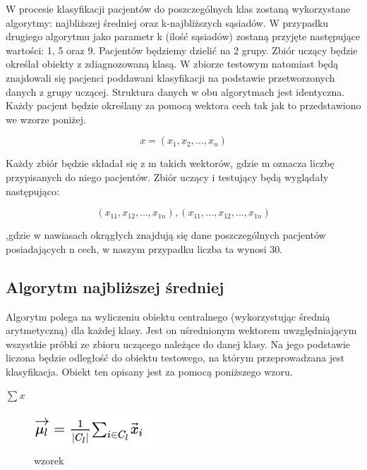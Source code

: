 \documentclass[12pt]{article}
\begin{document}
\indent W procesie klasyfikacji pacjentów do poszczególnych klas zostaną wykorzystane algorytmy: najbliższej średniej oraz k-najbliższych sąsiadów. W przypadku drugiego algorytmu jako parametr k (ilość sąsiadów) zostaną przyjęte następujące wartości: 1, 5 oraz 9. Pacjentów będziemy dzielić na 2 grupy. Zbiór uczący będzie określał obiekty z zdiagnozowaną klasą. W zbiorze testowym natomiast będą znajdowali się pacjenci poddawani klasyfikacji na podstawie przetworzonych danych z grupy uczącej. Struktura danych w obu algorytmach jest identyczna. Każdy pacjent będzie określany za pomocą wektora cech tak jak to przedstawiono we wzorze poniżej.
\begin{center}
\[ x = (x_1, x_2, ... , x_n)\]
\end{center}


Każdy zbiór będzie składał się z m takich wektorów, gdzie m oznacza liczbę przypisanych do niego pacjentów.
Zbiór uczący i testujący będą wyglądały następująco:
\begin{center}
\[ (x_{11}, x_{12}, ... , x_{1n}), (x_{11}, ..., x_{12}, ... , x_{1n})\]
\end{center}

,gdzie w nawiasach okrągłych znajdują się dane poszczególnych pacjentów posiadających n cech, w naszym przypadku liczba ta wynosi 30.
\subsection{Algorytm najbliższej średniej}
\indent Algorytm polega na wyliczeniu obiektu centralnego (wykorzystując średnią arytmetyczną) dla każdej klasy. Jest on uśrednionym wektorem uwzględniającym wszystkie próbki ze zbioru uczącego należące do danej klasy. Na jego podstawie liczona będzie odległość do obiektu testowego, na którym przeprowadzana jest klasyfikacja. Obiekt ten opisany jest za pomocą poniższego wzoru.
\begin{center}
$ \sum{x}$
\end{center}
\begin{figure}[H]
	\centering
		\includegraphics[scale=1]{images/nm_average.png}
	\caption{wzorek}
\end{figure}
\end{document}
